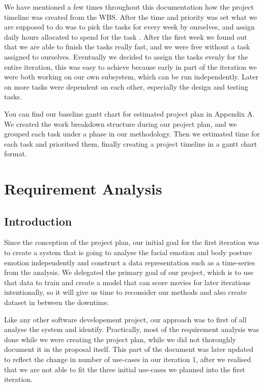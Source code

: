 \documentclass[12pt,a4paper,man]{report}
\begin{document}
We have mentioned a few times throughout this documentation how the project timeline was created from the WBS. After the time and priority was set what we are supposed to do  was to pick the tasks for every week by ourselves, and assign daily hours allocated to spend for the task . After the first week we found out that we are able to finish the tasks really fast, and we were free without a task assigned to ourselves. Eventually we decided to assign the tasks evenly for the entire iteration, this was easy to achieve because early in part of the iteration we were both working on our own subsystem, which can be run independently. Later on more tasks were dependent on each other, especially the design and testing tasks. 

You can find our baseline gantt chart for estimated project plan in Appendix A. We created the work breakdown structure during our project plan, and we grouped each task under a phase in our methodology. Then we estimated time for each task and prioritsed them, finally creating a project timeline in a gantt chart format. 
\part{Requirement Analysis}
\label{sec:orgee15efb}
\chapter{Introduction}
\label{sec:org127156c}
Since the conception of the project plan, our initial goal for the first iteration was to create a system that is going to analyse the facial emotion and body posture emotion independently and construct a data representation such as a time-series from the analysis. We delegated the primary goal of our project, which is to use that data to train and create a model that can score movies for later iterations intentionally, so it will give us time to reconsider our methods and also create dataset in between the downtime.

Like any other software developement project, our approach was to first of all analyse the system and identify. Practically, most of the requirement analysis was done while we were creating the project plan, while we did not thoroughly document it in the proposal itself. This part of the document was later updated to reflect the change in number of use-cases in our iteration 1, after we realised that we are not able to fit the three initial use-cases we planned into the first iteration.
\end{document}
